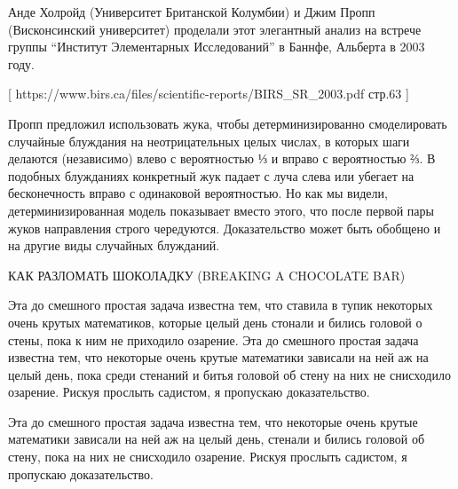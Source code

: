  Анде Холройд (Университет Британской Колумбии) и Джим Пропп (Висконсинский университет) проделали этот элегантный анализ на встрече группы “Институт Элементарных Исследований” в Баннфе, Альберта в 2003 году. 


[ https://www.birs.ca/files/scientific-reports/BIRS_SR_2003.pdf  стр.63 ]


Пропп предложил использовать жука, чтобы детерминизированно смоделировать случайные блуждания на неотрицательных целых числах, в которых шаги делаются (независимо) влево с вероятностью ⅓  и вправо с вероятностью  ⅔. В подобных блужданиях  конкретный жук падает с луча слева или убегает на бесконечность вправо с одинаковой вероятностью. Но как мы видели, детерминизированная модель показывает вместо этого, что  после первой пары жуков направления строго чередуются.
Доказательство может быть обобщено и на другие виды случайных блужданий.




КАК РАЗЛОМАТЬ ШОКОЛАДКУ (BREAKING A CHOCOLATE BAR)


 Эта до смешного простая задача известна тем, что  ставила в тупик некоторых очень крутых математиков,  которые целый день стонали и бились  головой о стены, пока к ним не приходило озарение.
  Эта до смешного простая задача известна тем, что некоторые очень крутые математики зависали на ней аж на целый день, пока среди  стенаний и битья головой об стену на них не снисходило озарение. Рискуя прослыть садистом, я пропускаю  доказательство.


Эта до смешного простая задача известна тем, что некоторые очень крутые математики зависали на ней аж на целый день, стенали и бились головой об стену, пока на них не снисходило озарение. Рискуя прослыть садистом, я пропускаю  доказательство.